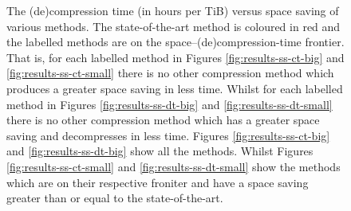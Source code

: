 \begin{figure}
{}
\caption{\label{fig:results-ss-t}The (de)compression time (in hours per TiB)
	versus space saving of various methods. The state-of-the-art method is
	coloured in red and the labelled methods are on the
	space--(de)compression-time frontier. That is, for each labelled method
	in Figures \ref{fig:results-ss-ct-big} and
	\ref{fig:results-ss-ct-small}
	there is no other compression method which produces a greater space
	saving in less time. Whilst for each labelled method in Figures
	\ref{fig:results-ss-dt-big} and \ref{fig:results-ss-dt-small} there is
	no other compression method which has a greater space saving and
	decompresses in less time.
	Figures \ref{fig:results-ss-ct-big} and \ref{fig:results-ss-dt-big} show all the
	methods. Whilst Figures \ref{fig:results-ss-ct-small} and
	\ref{fig:results-ss-dt-small} show the methods which are on their
	respective froniter and have a space saving greater than or equal to the
	state-of-the-art.}
\end{figure}
